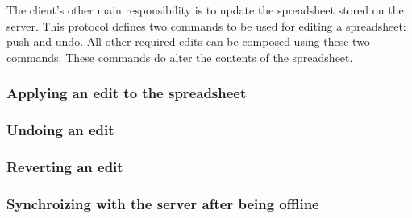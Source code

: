 The client’s other main responsibility is to update the spreadsheet stored 
on the server. This protocol defines two commands to be used for editing a 
spreadsheet: \hyperref[sec:message:push]{push} and \hyperref[sec:message:undo]{undo}. 
All other required edits can be composed using these two commands. These 
commands do alter the contents of the spreadsheet.

\subsubsection{Applying an edit to the spreadsheet}


\subsubsection{Undoing an edit}


\subsubsection{Reverting an edit}


\subsubsection{Synchroizing with the server after being offline}
